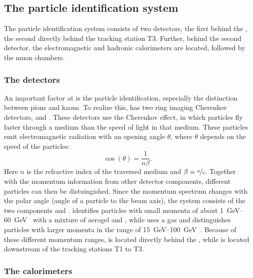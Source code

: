 \subsection{The particle identification system}
\label{sec:PartID}

The particle identification system consists of two \rich detectors, the first behind the \velo, the second directly behind the tracking station T3.
Further, behind the second \rich detector, the electromagnetic and hadronic calorimeters are located, followed by the muon chambers.

\subsubsection*{The \rich detectors}
\label{sec:rich}

An important factor at \lhcb is the particle identification, especially the distinction between pions and kaons.
To realize this, \lhcb has two ring imaging Cherenkov detectors, \richone and \richtwo.
These detectors use the Cherenkov effect, in which particles fly faster through a medium than the speed of light in that medium.
These particles emit electromagnetic radiation with an opening angle $\theta$, where $\theta$ depends on the speed of the particles:
\begin{equation}
\cos\!\left(\theta\right) = \frac{1}{n\beta}.
\end{equation}
Here $n$ is the refractive index of the traversed medium and $\beta = \nicefrac{v}{c}$.
Together with the momentum information from other detector components, different particles can then be distuingished.
Since the momentum spectrum changes with the polar angle (angle of a particle to the beam axis), the \rich system consists of the two components \richone and \richtwo.
\richone identifies particles with small momenta of about \SIrange{1}{60}{\giga\electronvolt}~\cite{Alves:2008zz} with a mixture of aerogel and \cfourften, while \richtwo uses a \cffour gas and distinguishes particles with larger momenta in the range of \SIrange{15}{100}{\giga\electronvolt}~\cite{Alves:2008zz}. Because of these different momentum ranges, \richone is located directly behind the \velo, while \richtwo is located downstream of the tracking stations T1 to T3.

\subsubsection*{The calorimeters}
\label{sec:calorimeters}

